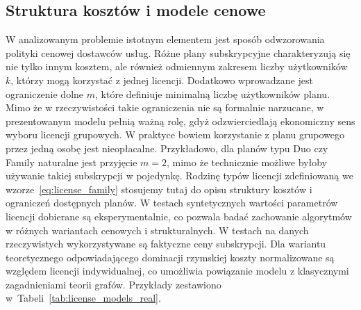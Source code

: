 

\subsection{Struktura kosztów i modele cenowe}

W analizowanym problemie istotnym elementem jest sposób odwzorowania polityki cenowej dostawców usług.
Różne plany subskrypcyjne charakteryzują się nie tylko innym kosztem, ale również odmiennym zakresem liczby użytkowników $k$, którzy mogą korzystać z jednej licencji.
Dodatkowo wprowadzane jest ograniczenie dolne $m$, które definiuje minimalną liczbę użytkowników planu.
Mimo że w rzeczywistości takie ograniczenia nie są formalnie narzucane, w prezentowanym modelu pełnią ważną rolę, gdyż odzwierciedlają ekonomiczny sens wyboru licencji grupowych.
W praktyce bowiem korzystanie z planu grupowego przez jedną osobę jest nieopłacalne.
Przykładowo, dla planów typu Duo czy Family naturalne jest przyjęcie $m=2$, mimo że technicznie możliwe byłoby używanie takiej subskrypcji w pojedynkę.
Rodzinę typów licencji zdefiniowaną we wzorze~\eqref{eq:license_family} stosujemy tutaj do opisu struktury kosztów i ograniczeń dostępnych planów.
W testach syntetycznych wartości parametrów licencji dobierane są eksperymentalnie, co pozwala badać zachowanie algorytmów w różnych wariantach cenowych i strukturalnych.
W testach na danych rzeczywistych wykorzystywane są faktyczne ceny subskrypcji.
Dla wariantu teoretycznego odpowiadającego dominacji rzymskiej koszty normalizowane są względem licencji indywidualnej, co umożliwia powiązanie modelu z klasycznymi zagadnieniami teorii grafów.
Przykłady zestawiono w~Tabeli~\ref{tab:license_models_real}.



